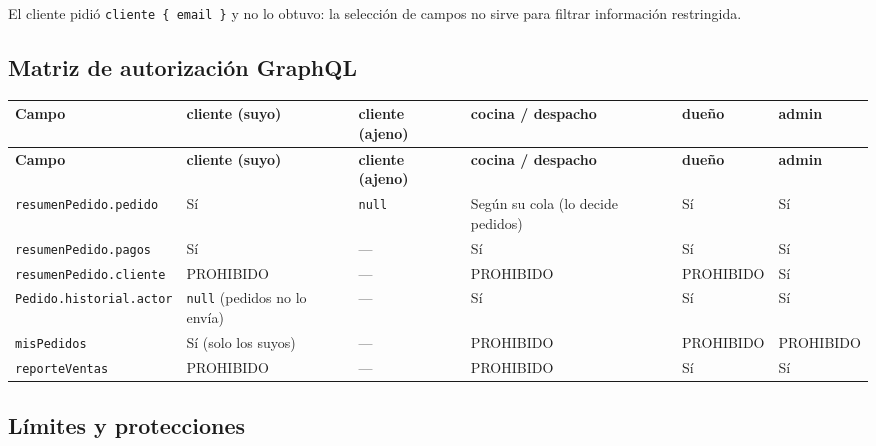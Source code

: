 El cliente pidió \texttt{cliente \{ email \}} y no lo obtuvo: la selección de campos no sirve para filtrar información restringida.


\subsection{Matriz de autorización GraphQL}

{\footnotesize
\setlength{\tabcolsep}{3pt}\renewcommand{\arraystretch}{1.15}
\begin{longtable}{|>{\raggedright\arraybackslash}p{}|>{\raggedright\arraybackslash}p{}|>{\raggedright\arraybackslash}p{}|>{\raggedright\arraybackslash}p{}|>{\raggedright\arraybackslash}p{}|>{\raggedright\arraybackslash}p{}|}
\hline
\textbf{Campo} & \textbf{cliente (suyo)} & \textbf{cliente (ajeno)} & \textbf{cocina / despacho} & \textbf{dueño} & \textbf{admin} \\ \hline
\endfirsthead
\hline
\textbf{Campo} & \textbf{cliente (suyo)} & \textbf{cliente (ajeno)} & \textbf{cocina / despacho} & \textbf{dueño} & \textbf{admin} \\ \hline
\endhead
\texttt{resumenPedido.\allowbreak{}pedido} & Sí & \texttt{null} & Según su cola (lo decide pedidos) & Sí & Sí \\ \hline
\texttt{resumenPedido.\allowbreak{}pagos} & Sí & — & Sí & Sí & Sí \\ \hline
\texttt{resumenPedido.\allowbreak{}cliente} & PROHIBIDO & — & PROHIBIDO & PROHIBIDO & Sí \\ \hline
\texttt{Pedido.\allowbreak{}historial.\allowbreak{}actor} & \texttt{null} (pedidos no lo envía) & — & Sí & Sí & Sí \\ \hline
\texttt{misPedidos} & Sí (solo los suyos) & — & PROHIBIDO & PROHIBIDO & PROHIBIDO \\ \hline
\texttt{reporteVentas} & PROHIBIDO & — & PROHIBIDO & Sí & Sí \\ \hline
\end{longtable}
}

\subsection{Límites y protecciones}

